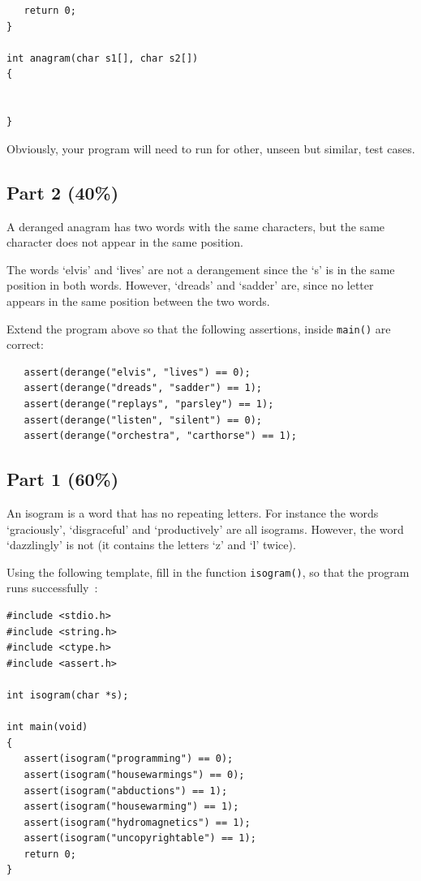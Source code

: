 \begin{appendices}
\begin{verbatim}
   return 0;
}

int anagram(char s1[], char s2[])
{


}
\end{verbatim} 

Obviously, your program will need to run for other, unseen but similar, test cases. 

\subsection*{Part 2 (40\%)}

A deranged anagram has two words with the same characters, but the same
character does not appear in the same position.

The words `elvis' and `lives' are not a derangement since the `s' is
in the same position in both words.
However, `dreads' and `sadder' are, since no letter appears in the
same position between the two words.

Extend the program above so that the following assertions, inside \verb^main()^
are correct:
\begin{verbatim}
   assert(derange("elvis", "lives") == 0);
   assert(derange("dreads", "sadder") == 1);
   assert(derange("replays", "parsley") == 1);
   assert(derange("listen", "silent") == 0);
   assert(derange("orchestra", "carthorse") == 1);
\end{verbatim}



\subsection*{Part 1 (60\%)}

An isogram is a word that has no repeating letters. For instance the words `graciously', `disgraceful' and
`productively' are all isograms. However, the word `dazzlingly' is not (it contains the letters `z' and `l'
twice).

Using the following template, fill in the function \verb^isogram()^, so that the program runs
successfully~:
\begin{verbatim}
#include <stdio.h>
#include <string.h>
#include <ctype.h>
#include <assert.h>

int isogram(char *s);

int main(void)
{
   assert(isogram("programming") == 0);
   assert(isogram("housewarmings") == 0);
   assert(isogram("abductions") == 1);
   assert(isogram("housewarming") == 1);
   assert(isogram("hydromagnetics") == 1);
   assert(isogram("uncopyrightable") == 1);
   return 0;
}


\end{verbatim}
\end{appendices}
